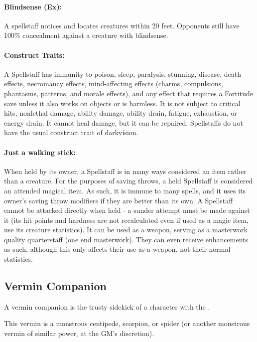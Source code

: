 \paragraph{Blindsense (Ex):} A spellstaff notices and locates creatures within 20 feet. Opponents still have 100\% concealment against a creature with blindsense. 
 
\paragraph{Construct Traits:} A Spellstaff has immunity to poison, sleep, paralysis, stunning, disease, death effects, 
necromancy effects, mind-affecting effects (charms, compulsions, phantasms, patterns, and morale effects), 
and any effect that requires a Fortitude save unless it also works on objects or is harmless. 
It is not subject to critical hits, nonlethal damage, ability damage, ability drain, fatigue, exhaustion, or energy drain. 
It cannot heal damage, but it can be repaired. 
Spellstaffs do not have the usual construct trait of darkvision.

\paragraph{Just a walking stick:} When held by its owner, a Spellstaff is in many ways considered an item rather than a creature.
For the purposes of saving throws, a held Spellstaff is considered an attended magical item.
As such, it is immune to many spells, and it uses its owner's saving throw modifiers if they are better than its own.
A Spellstaff cannot be attacked directly when held - a sunder attempt must be made against it
(its hit points and hardness are not recalculated even if used as a magic item, use its creature statistics).
It can be used as a weapon, serving as a masterwork quality quarterstaff (one end masterwork).
They can even receive enhancements as such, although this only affects their use as a weapon, not their normal statistics.

\subsection{Vermin Companion}
\label{sec:VerminCompanion}
A vermin companion is the trusty sidekick of a character with the .

This vermin is a monstrous centipede, scorpion, or spider (or another monstrous vermin of similar power, at the GM's discretion).

